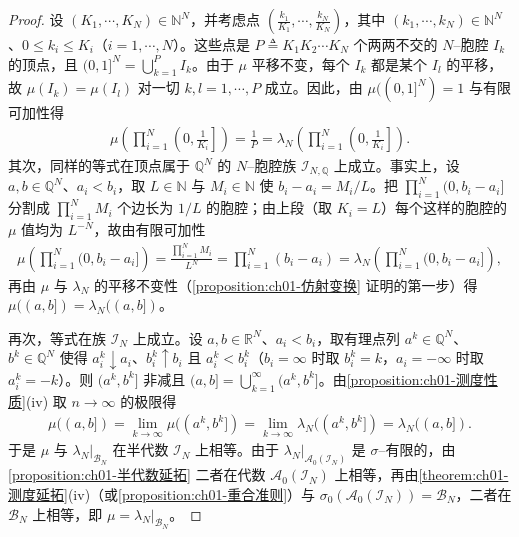 \documentclass[../../main.tex]{subfiles}%
\begin{document}
\begin{proof}
设 $(K_1,\cdots ,K_N)\in\mathbb{N}^N$，并考虑点 $\left(\frac{k_1}{K_1},\cdots ,\frac{k_N}{K_N}\right)$，其中 $(k_1,\cdots ,k_N)\in\mathbb{N}^N$、$0\leqslant k_i\leqslant K_i$（$i=1,\cdots ,N$）。这些点是 $P\triangleq K_1K_2\cdots K_N$ 个两两不交的 $N$--胞腔 $I_k$ 的顶点，且 $(0,1]^N=\bigcup_{k=1}^P I_k$。由于 $\mu$ 平移不变，每个 $I_k$ 都是某个 $I_l$ 的平移，故 $\mu(I_k)=\mu(I_l)$ 对一切 $k,l=1,\cdots ,P$ 成立。因此，由 $\mu((0,1]^N)=1$ 与有限可加性得
\begin{align*}
\mu\left(\prod_{i=1}^N\left(0,\frac{1}{K_i}\right]\right)=\frac{1}{P}=\lambda_N\left(\prod_{i=1}^N\left(0,\frac{1}{K_i}\right]\right).
\end{align*}
其次，同样的等式在顶点属于 $\mathbb{Q}^N$ 的 $N$--胞腔族 $\mathcal{I}_{N,\mathbb{Q}}$ 上成立。事实上，设 $a,b\in\mathbb{Q}^N$、$a_i<b_i$，取 $L\in\mathbb{N}$ 与 $M_i\in\mathbb{N}$ 使 $b_i-a_i=M_i/L$。把 $\prod_{i=1}^N(0,b_i-a_i]$ 分割成 $\prod_{i=1}^NM_i$ 个边长为 $1/L$ 的胞腔；由上段（取 $K_i=L$）每个这样的胞腔的 $\mu$ 值均为 $L^{-N}$，故由有限可加性
\begin{align*}
\mu\left(\prod_{i=1}^N(0,b_i-a_i]\right)=\frac{\prod_{i=1}^NM_i}{L^N}=\prod_{i=1}^N(b_i-a_i)=\lambda_N\left(\prod_{i=1}^N(0,b_i-a_i]\right),
\end{align*}
再由 $\mu$ 与 $\lambda_N$ 的平移不变性（\cref{proposition:ch01-仿射变换} 证明的第一步）得 $\mu((a,b])=\lambda_N((a,b])$。

再次，等式在族 $\mathcal{I}_N$ 上成立。设 $a,b\in\mathbb{R}^N$、$a_i<b_i$，取有理点列 $a^k\in\mathbb{Q}^N$、$b^k\in\mathbb{Q}^N$ 使得 $a_i^k\downarrow a_i$、$b_i^k\uparrow b_i$ 且 $a_i^k<b_i^k$（$b_i=\infty$ 时取 $b_i^k=k$，$a_i=-\infty$ 时取 $a_i^k=-k$）。则 $(a^k,b^k]$ 非减且 $(a,b]=\bigcup_{k=1}^\infty(a^k,b^k]$。由\cref{proposition:ch01-测度性质}(iv) 取 $n\to\infty$ 的极限得
\begin{align*}
\mu((a,b])=\lim_{k\to\infty}\mu((a^k,b^k])=\lim_{k\to\infty}\lambda_N((a^k,b^k])=\lambda_N((a,b]).
\end{align*}
于是 $\mu$ 与 $\lambda_N|_{\mathcal{B}_N}$ 在半代数 $\mathcal{I}_N$ 上相等。由于 $\lambda_N|_{\mathcal{A}_0(\mathcal{I}_N)}$ 是 $\sigma$--有限的，由\cref{proposition:ch01-半代数延拓} 二者在代数 $\mathcal{A}_0(\mathcal{I}_N)$ 上相等，再由\cref{theorem:ch01-测度延拓}(iv)（或\cref{proposition:ch01-重合准则}）与 $\sigma_0(\mathcal{A}_0(\mathcal{I}_N))=\mathcal{B}_N$，二者在 $\mathcal{B}_N$ 上相等，即 $\mu=\lambda_N|_{\mathcal{B}_N}$。
\end{proof}
\end{document}
